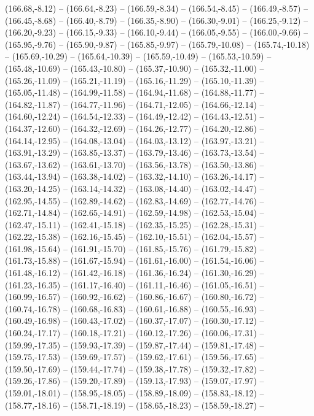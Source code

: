 {  (166.68,-8.12) -- (166.64,-8.23) -- (166.59,-8.34) -- (166.54,-8.45) -- (166.49,-8.57) -- (166.45,-8.68) -- (166.40,-8.79) --
  (166.35,-8.90) -- (166.30,-9.01) -- (166.25,-9.12) -- (166.20,-9.23) -- (166.15,-9.33) -- (166.10,-9.44) -- (166.05,-9.55) --
  (166.00,-9.66) -- (165.95,-9.76) -- (165.90,-9.87) -- (165.85,-9.97) -- (165.79,-10.08) -- (165.74,-10.18) -- (165.69,-10.29) --
  (165.64,-10.39) -- (165.59,-10.49) -- (165.53,-10.59) -- (165.48,-10.69) -- (165.43,-10.80) -- (165.37,-10.90) -- (165.32,-11.00) --
  (165.26,-11.09) -- (165.21,-11.19) -- (165.16,-11.29) -- (165.10,-11.39) -- (165.05,-11.48) -- (164.99,-11.58) -- (164.94,-11.68) --
  (164.88,-11.77) -- (164.82,-11.87) -- (164.77,-11.96) -- (164.71,-12.05) -- (164.66,-12.14) -- (164.60,-12.24) -- (164.54,-12.33) --
  (164.49,-12.42) -- (164.43,-12.51) -- (164.37,-12.60) -- (164.32,-12.69) -- (164.26,-12.77) -- (164.20,-12.86) -- (164.14,-12.95) --
  (164.08,-13.04) -- (164.03,-13.12) -- (163.97,-13.21) -- (163.91,-13.29) -- (163.85,-13.37) -- (163.79,-13.46) -- (163.73,-13.54) --
  (163.67,-13.62) -- (163.61,-13.70) -- (163.56,-13.78) -- (163.50,-13.86) -- (163.44,-13.94) -- (163.38,-14.02) -- (163.32,-14.10) --
  (163.26,-14.17) -- (163.20,-14.25) -- (163.14,-14.32) -- (163.08,-14.40) -- (163.02,-14.47) -- (162.95,-14.55) -- (162.89,-14.62) --
  (162.83,-14.69) -- (162.77,-14.76) -- (162.71,-14.84) -- (162.65,-14.91) -- (162.59,-14.98) -- (162.53,-15.04) -- (162.47,-15.11) --
  (162.41,-15.18) -- (162.35,-15.25) -- (162.28,-15.31) -- (162.22,-15.38) -- (162.16,-15.45) -- (162.10,-15.51) -- (162.04,-15.57) --
  (161.98,-15.64) -- (161.91,-15.70) -- (161.85,-15.76) -- (161.79,-15.82) -- (161.73,-15.88) -- (161.67,-15.94) -- (161.61,-16.00) --
  (161.54,-16.06) -- (161.48,-16.12) -- (161.42,-16.18) -- (161.36,-16.24) -- (161.30,-16.29) -- (161.23,-16.35) -- (161.17,-16.40) --
  (161.11,-16.46) -- (161.05,-16.51) -- (160.99,-16.57) -- (160.92,-16.62) -- (160.86,-16.67) -- (160.80,-16.72) -- (160.74,-16.78) --
  (160.68,-16.83) -- (160.61,-16.88) -- (160.55,-16.93) -- (160.49,-16.98) -- (160.43,-17.02) -- (160.37,-17.07) -- (160.30,-17.12) --
  (160.24,-17.17) -- (160.18,-17.21) -- (160.12,-17.26) -- (160.06,-17.31) -- (159.99,-17.35) -- (159.93,-17.39) -- (159.87,-17.44) --
  (159.81,-17.48) -- (159.75,-17.53) -- (159.69,-17.57) -- (159.62,-17.61) -- (159.56,-17.65) -- (159.50,-17.69) -- (159.44,-17.74) --
  (159.38,-17.78) -- (159.32,-17.82) -- (159.26,-17.86) -- (159.20,-17.89) -- (159.13,-17.93) -- (159.07,-17.97) -- (159.01,-18.01) --
  (158.95,-18.05) -- (158.89,-18.09) -- (158.83,-18.12) -- (158.77,-18.16) -- (158.71,-18.19) -- (158.65,-18.23) -- (158.59,-18.27) --
}
